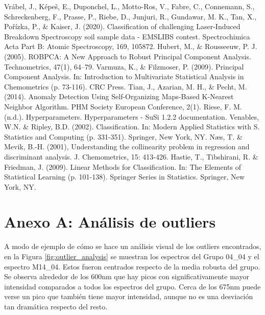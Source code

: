 \documentclass[12pt]{article}
\begin{document}
\begin{thebibliography}{0}
     Vrábel, J., Képeš, E., Duponchel, L., Motto-Ros, V., Fabre, C., Connemann, S., Schreckenberg, F., Prasse, P., Riebe, D., Junjuri, R., Gundawar, M. K., Tan, X., Pořízka, P., \& Kaiser, J. (2020). Classification of challenging Laser-Induced Breakdown Spectroscopy soil sample data - EMSLIBS contest. Spectrochimica Acta Part B: Atomic Spectroscopy, 169, 105872. 
     Hubert, M., \& Rousseeuw, P. J. (2005). ROBPCA: A New Approach to Robust Principal Component Analysis. Technometrics, 47(1), 64–79. 
    Varmuza, K., \& Filzmoser, P. (2009). Principal Component Analysis. In: Introduction to Multivariate Statistical Analysis in Chemometrics (p. 73-116). CRC Press.
    Tian, J., Azarian, M. H., \& Pecht, M. (2014). Anomaly Detection Using Self-Organizing Maps-Based K-Nearest Neighbor Algorithm. PHM Society European Conference, 2(1).
    Riese, F. M. (n.d.). Hyperparameters. Hyperparameters - SuSi 1.2.2 documentation.
    Venables, W.N. \& Ripley, B.D. (2002). Classification. In: Modern Applied Statistics with S. Statistics and Computing (p. 331-351). Springer, New York, NY.
    Næs, T. \& Mevik, B.-H. (2001), Understanding the collinearity problem in regression and discriminant analysis. J. Chemometrics, 15: 413-426.
    Hastie, T., Tibshirani, R. \& Friedman, J. (2009). Linear Methods for Classification. In: The Elements of Statistical Learning (p. 101-138). Springer Series in Statistics. Springer, New York, NY. 
    
\end{thebibliography}

\newpage

\section*{Anexo A: Análisis de outliers}

A modo de ejemplo de cómo se hace un análisis visual de los outliers encontrados, en la Figura \ref{fig:outlier_analysis} se muestran los espectros del Grupo 04\_04 y el espectro M14\_04. Estos fueron centrados respecto de la media robusta del grupo. Se observa alrededor de los 600nm que hay picos con significativamente mayor intensidad comparados a todos los espectros del grupo. Cerca de los 675nm puede verse un pico que también tiene mayor intensidad, aunque no es una desviación tan dramática respecto del resto.
\end{document}
